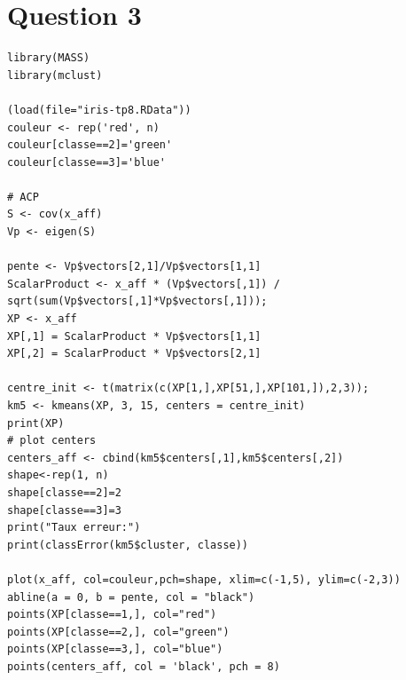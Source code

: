 \documentclass[a4paper,12pt]{report}
\begin{document}
\newpage

\section*{Question 3}

\begin{lstlisting}
library(MASS)
library(mclust)

(load(file="iris-tp8.RData"))
couleur <- rep('red', n)
couleur[classe==2]='green'
couleur[classe==3]='blue'

# ACP
S <- cov(x_aff)
Vp <- eigen(S)  

pente <- Vp$vectors[2,1]/Vp$vectors[1,1]
ScalarProduct <- x_aff * (Vp$vectors[,1]) / sqrt(sum(Vp$vectors[,1]*Vp$vectors[,1]));
XP <- x_aff
XP[,1] = ScalarProduct * Vp$vectors[1,1]
XP[,2] = ScalarProduct * Vp$vectors[2,1]

centre_init <- t(matrix(c(XP[1,],XP[51,],XP[101,]),2,3));
km5 <- kmeans(XP, 3, 15, centers = centre_init)
print(XP)
# plot centers
centers_aff <- cbind(km5$centers[,1],km5$centers[,2])
shape<-rep(1, n) 
shape[classe==2]=2
shape[classe==3]=3
print("Taux erreur:")
print(classError(km5$cluster, classe))

plot(x_aff, col=couleur,pch=shape, xlim=c(-1,5), ylim=c(-2,3))
abline(a = 0, b = pente, col = "black")
points(XP[classe==1,], col="red")
points(XP[classe==2,], col="green")
points(XP[classe==3,], col="blue")
points(centers_aff, col = 'black', pch = 8)
\end{lstlisting}
\end{document}
